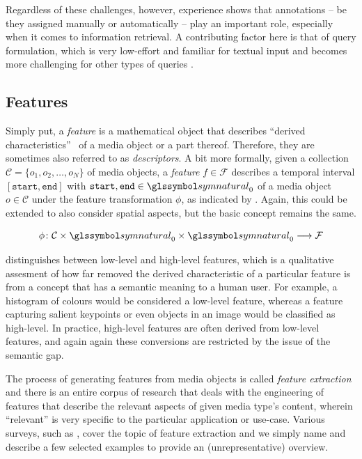 Regardless of these challenges, however, experience shows that annotations -- be they assigned manually or automatically -- play an important role, especially when it comes to information retrieval. A contributing factor here is that of query formulation, which is very low-effort and familiar for textual input and becomes more challenging for other types of queries .

\subsection{Features}
Simply put, a \emph{feature} is a mathematical object that describes ``derived characteristics''~\cite{Blanken:2007multimedia} of a media object or a part thereof. Therefore, they are sometimes also referred to as \emph{descriptors}. A bit more formally, given a collection $\mathcal{C} = \lbrace o_1, o_2, \ldots, o_N \rbrace$ of media objects, a \emph{feature} $f \in \mathcal{F}$ describes a temporal interval $[ \texttt{start}, \texttt{end} ]$ with $\texttt{start},\texttt{end} \in \symnatural_0$ of a media object $o \in \mathcal{C}$ under the feature transformation $\phi$, as indicated by . Again, this could be extended to also consider spatial aspects, but the basic concept remains the same.

\begin{equation}
    \label{eq:feature_transformation}
    \phi \colon \mathcal{C} \times \symnatural_0 \times \symnatural_0 \longrightarrow \mathcal{F}
\end{equation}

\cite{Blanken:2007multimedia} distinguishes between low-level and high-level features, which is a qualitative assesment of how far removed the derived characteristic of a particular feature is from a concept that has a semantic meaning to a human user. For example, a histogram of colours would be considered a low-level feature, whereas a feature capturing salient keypoints or even objects in an image would be classified as high-level. In practice, high-level features are often derived from low-level features, and again again these conversions are restricted by the issue of the semantic gap.

The process of generating features from media objects is called \emph{feature extraction} \cite{Blanken:2007multimedia} and there is an entire corpus of research that deals with the engineering of features that describe the relevant aspects of given media type's content, wherein ``relevant'' is very specific to the particular application or use-case. Various surveys, such as \cite{Ding:2012ASurvey,McKinney:2003Features,Salau:2019Feature}, cover the topic of feature extraction and we simply name and describe a few selected examples to provide an (unrepresentative) overview. 

